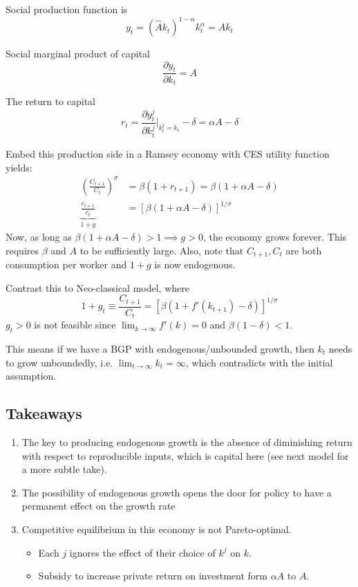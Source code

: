 \documentclass[twocolumn, fleqn]{article}
\begin{document}
			Social production function is
			\[y_t = (\hat{A}k_t)^{1-\alpha}k_t^\alpha=Ak_t\]

			Social marginal product of capital
			\[\frac{\partial y_t}{\partial k_t}= A\]

			The return to capital
			\[r_t = \frac{\partial y_t^j}{\partial k_t^j}\Big|_{k_t^j=k_t}-\delta=\alpha A -\delta\]

			Embed this production side in a Ramsey economy with CES utility function yields:
			\begin{align*}
				\left( \frac{C_{t+1}}{C_t} \right)^{\sigma} &= \beta (1+ r_{t+1})=\beta (1+\alpha A -\delta)\\
				\underbrace{\frac{c_{t+1}}{c_t}}_{1+g} &= \left[\beta (1+\alpha A -\delta)\right]^{1/\sigma}
			\end{align*}
			Now, as long as $\beta (1+\alpha A -\delta)>1 \implies g>0$, the economy grows forever.
			This requires $\beta$ and $A$ to be sufficiently large.
			Also, note that $C_{t+1}, C_t$ are both consumption per worker and $1+g$ is now endogenous.

			Contrast this to Neo-classical model, where
			\[1+g_t \equiv \frac{C_{t+1}}{C_t} =[\beta(1+f'(k_{t+1})-\delta)]^{1/\sigma} \]
			$g_t >0$ is not feasible since $\lim_{k\rightarrow \infty}f'(k)=0$ and $\beta(1-\delta)<1$.

			This means if we have a BGP with endogenous/unbounded growth, then $k_t$ needs to grow unboundedly, i.e. $\lim_{t \rightarrow \infty} k_t = \infty$, which contradicts with the initial assumption.


		\subsection{Takeaways}\label{subsec:takeaways}
			\begin{enumerate}
				\item The key to producing endogenous growth is the absence of diminishing return with respect to
				reproducible inputs, which is capital here (see next model for a more subtle take).
				\item The possibility of endogenous growth opens the door for policy to have a permanent effect on the
				growth rate
				\item Competitive equilibrium in this economy is not Pareto-optimal.
				\begin{itemize}
					\item Each $j$ ignores the effect of their choice of $k^j$ on $k$.
					\item Subsidy to increase private return on investment form $\alpha A$ to $A$.
				\end{itemize}
			\end{enumerate}
\end{document}
